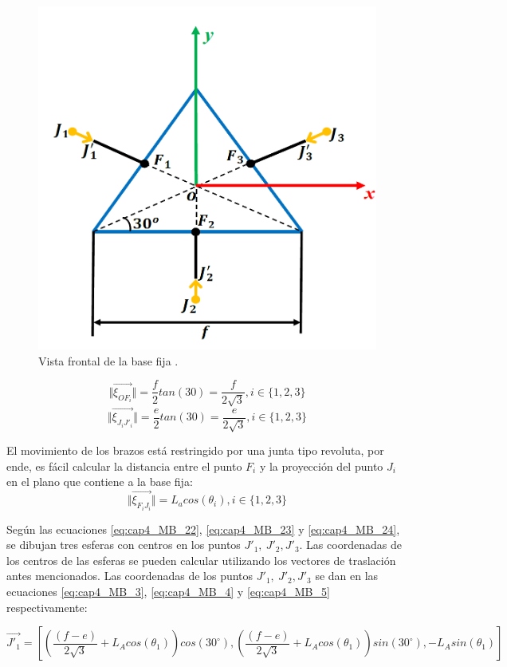             \begin{figure}[htb]
                 \centering
               \includegraphics[width=0.45\linewidth]{Main/Chapter4/Images4/DIBUJO29.png}
               \caption{Vista frontal  de la base fija \cite{Path_Planning_and_Trajectory_Optimization}.}
               \label{f:cap4_mb_cineposdirect}
            \end{figure}
            
    \begin{equation}
        \Vert \overrightarrow{\xi_{OF_i}} \Vert=\frac{f}{2}tan(30)=\frac{f}{2\sqrt{3}} , i \in \{1,2,3\}
    \end{equation}
    \begin{equation}
        \Vert \overrightarrow{\xi_{J_iJ'_i}} \Vert=\frac{e}{2}tan(30)=\frac{e}{2\sqrt{3}} , i \in \{1,2,3\}
    \end{equation}
    
        \newpage

    El movimiento de los brazos está restringido por una junta tipo revoluta, por ende, es fácil calcular la distancia entre el punto $F_i$ y la proyección del punto $J_i$ en el plano que contiene a la base fija:
    \begin{equation}
        \Vert \overrightarrow{\xi_{F_iJ_i}} \Vert=L_a cos(\theta_i) , i \in \{1,2,3\}
    \end{equation}
    
    Según las ecuaciones \ref{eq:cap4_MB_22}, \ref{eq:cap4_MB_23} y \ref{eq:cap4_MB_24}, se dibujan tres esferas con centros en los puntos \( J'_{1},~J'_{2},J'_{3} \). Las coordenadas de los centros de las esferas se pueden calcular utilizando los vectores de traslación antes mencionados. Las coordenadas de los puntos \( J'_{1},~J'_{2},J'_{3} \) se dan en las ecuaciones \ref{eq:cap4_MB_3}, \ref{eq:cap4_MB_4} y \ref{eq:cap4_MB_5} respectivamente:

  
          \begin{equation}
                \overrightarrow{J'_{1}}= \left [\left( \frac{(f-e)}{2\sqrt{3}}+{L}_{A}cos(\theta_1)\right) cos(30^\circ), \left(\frac{(f-e)}{2\sqrt{3}} + {L}_{A}cos(\theta_1)\right) sin(30^\circ), -L_{A}sin(\theta_1)\right]
        \label{eq:cap4_MB_3}
        \end{equation}    
        
